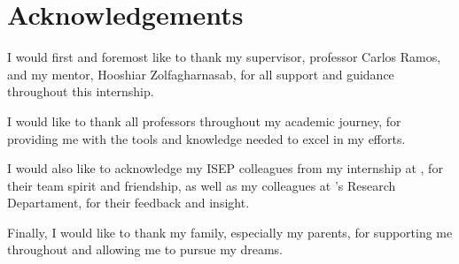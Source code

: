
\section*{Acknowledgements}

\hspace{\parindent}I would first and foremost like to thank my supervisor, professor Carlos Ramos, and my mentor, Hooshiar Zolfagharnasab, for all support and guidance throughout this internship.

I would like to thank all professors throughout my academic journey, for providing me with the tools and knowledge needed to excel in my efforts.

I would also like to acknowledge my ISEP colleagues from my internship at \faro, for their team spirit and friendship, as well as my colleagues at \faro's Research Departament, for their feedback and insight.

Finally, I would like to thank my family, especially my parents, for supporting me throughout and allowing me to pursue my dreams.
